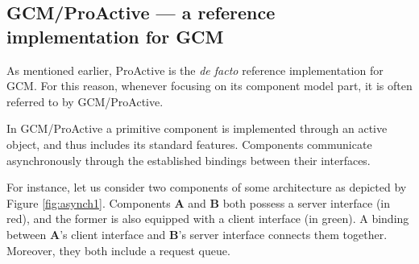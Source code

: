 \subsection{GCM/ProActive --- a reference implementation for GCM}
\label{sub:gcmpro}


		As mentioned earlier, ProActive is the \textit{de facto} reference implementation for \ac{GCM}.
	For this reason, whenever focusing on its component model part, it is often referred 
	to by GCM/ProActive.

		In GCM/ProActive a primitive component is implemented through an active object, and 
	thus includes its standard features. Components communicate asynchronously 
	through the established bindings between their interfaces. 
	
	
		For instance, let us consider two components of some architecture as depicted by Figure 
	\ref{fig:asynch1}. Components \textbf{A} and \textbf{B} both possess a server interface (in red),
	and the former is also equipped with a client interface (in green). A binding between
	\textbf{A}'s client interface and \textbf{B}'s server interface connects them together.
	Moreover, they both include a request queue.	
	

